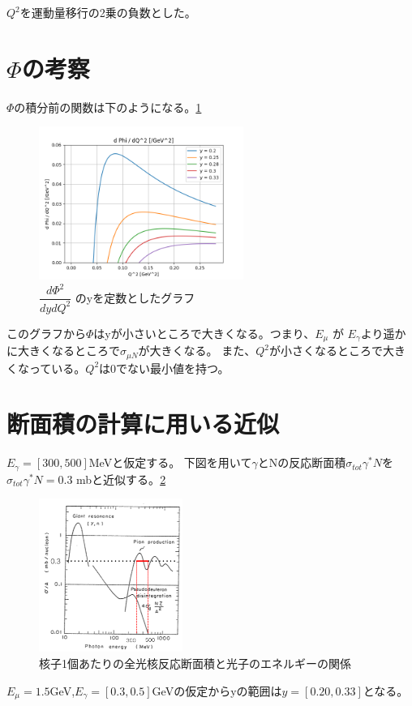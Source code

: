 $Q^2$を運動量移行の2乗の負数とした。


\section{\texorpdfstring{$\Phi$}{LG}の考察}
$\Phi$の積分前の関数は下のようになる。\ref{fig:test4}
\begin{figure}[H]
    \centering
    \includegraphics[height=5cm]{img/flux_fixed_y.png}
    \caption{$\dfrac{d\Phi ^2}{dydQ^2}$ のyを定数としたグラフ}
    \label{fig:test4}
\end{figure}

このグラフから$\Phi$はyが小さいところで大きくなる。つまり、$E_\mu$ が $E_\gamma$より遥かに大きくなるところで$\sigma_{\mu N}$が大きくなる。
また、$Q^2$が小さくなるところで大きくなっている。$Q^2$は0でない最小値を持つ。


\section{断面積の計算に用いる近似}
$E_\gamma = [300, 500]$MeVと仮定する。
下図を用いて$\gamma$とNの反応断面積$\sigma_{tot}\gamma^* N$を
$\sigma_{tot}\gamma^* N = 0.3$ mbと近似する。\ref*{fig:test5}
\begin{figure}[H]
    \centering
    \includegraphics[height=5cm]{img/sigma_tot.png}
    \caption{核子1個あたりの全光核反応断面積と光子のエネルギーの関係}
    \label{fig:test5}
\end{figure}

$E_\mu = 1.5$GeV,$E_\gamma = [0.3, 0.5]$GeVの仮定からyの範囲は$y = [0.20, 0.33]$となる。


